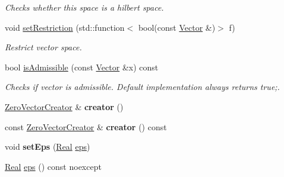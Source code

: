 \begin{DoxyCompactItemize}
\begin{DoxyCompactList}\small\item\em \-Checks whether this space is a hilbert space. \end{DoxyCompactList}\item 
void \hyperlink{classSpacy_1_1VectorSpace_a7c5f4a8c5937f9e07592483666b20ef7}{set\-Restriction} (std\-::function$<$ bool(const \hyperlink{classSpacy_1_1Vector}{\-Vector} \&)$>$ f)
\begin{DoxyCompactList}\small\item\em \-Restrict vector space. \end{DoxyCompactList}\item 
\hypertarget{classSpacy_1_1VectorSpace_a4beac78b082a364eb97e938b6c4928d2}{bool \hyperlink{classSpacy_1_1VectorSpace_a4beac78b082a364eb97e938b6c4928d2}{is\-Admissible} (const \hyperlink{classSpacy_1_1Vector}{\-Vector} \&x) const }\label{classSpacy_1_1VectorSpace_a4beac78b082a364eb97e938b6c4928d2}

\begin{DoxyCompactList}\small\item\em \-Checks if vector is admissible. \-Default implementation always returns true;. \end{DoxyCompactList}\item 
\hypertarget{classSpacy_1_1VectorSpace_a254d66fbb07d0abfaa583aba520d3dc3}{\hyperlink{classSpacy_1_1ZeroVectorCreator}{\-Zero\-Vector\-Creator} \& {\bfseries creator} ()}\label{classSpacy_1_1VectorSpace_a254d66fbb07d0abfaa583aba520d3dc3}

\item 
\hypertarget{classSpacy_1_1VectorSpace_acc3d5b5210cc810d8011e8a4308150e7}{const \hyperlink{classSpacy_1_1ZeroVectorCreator}{\-Zero\-Vector\-Creator} \& {\bfseries creator} () const }\label{classSpacy_1_1VectorSpace_acc3d5b5210cc810d8011e8a4308150e7}

\item 
\hypertarget{classSpacy_1_1Mixin_1_1Eps_a6b4c38a60848c0ab665fb3a81e181786}{void {\bfseries set\-Eps} (\hyperlink{classSpacy_1_1Real}{\-Real} \hyperlink{classSpacy_1_1Mixin_1_1Eps_a812b99b0abc1d78a34b4114907f23f52}{eps})}\label{classSpacy_1_1Mixin_1_1Eps_a6b4c38a60848c0ab665fb3a81e181786}

\item 
\hypertarget{classSpacy_1_1Mixin_1_1Eps_a812b99b0abc1d78a34b4114907f23f52}{\hyperlink{classSpacy_1_1Real}{\-Real} \hyperlink{classSpacy_1_1Mixin_1_1Eps_a812b99b0abc1d78a34b4114907f23f52}{eps} () const noexcept}\label{classSpacy_1_1Mixin_1_1Eps_a812b99b0abc1d78a34b4114907f23f52}


\end{DoxyCompactItemize}

